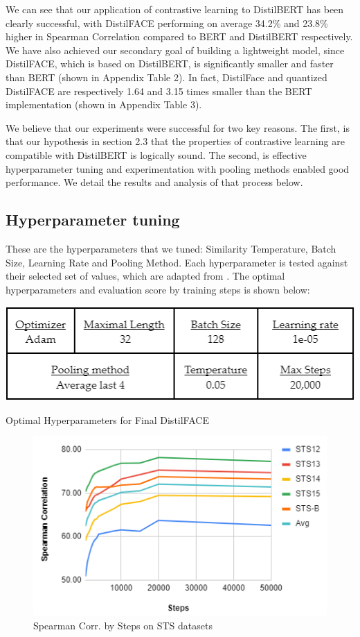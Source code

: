 \documentclass[10pt,twocolumn,letterpaper]{article}
\begin{document}
 We can see that our application of contrastive learning to DistilBERT has been clearly successful, with DistilFACE performing on average 34.2\% and 23.8\% higher in Spearman Correlation compared to BERT and DistilBERT respectively. We have also achieved our secondary goal of building a lightweight model, since DistilFACE, which is based on DistilBERT, is significantly smaller and faster than BERT \cite{1910.01108} (shown in Appendix Table 2).  In fact, DistilFace and quantized DistilFACE are respectively 1.64 and 3.15 times smaller than the BERT implementation (shown in Appendix Table 3). 


We believe that our experiments were successful for two key reasons. The first, is that our hypothesis in section 2.3 that the properties of contrastive learning are compatible with DistilBERT is logically sound. The second, is effective hyperparameter tuning and experimentation with pooling methods enabled good performance. We detail the results and analysis of that process below.

\subsection{Hyperparameter tuning}

These are the hyperparameters that we tuned: Similarity Temperature, Batch Size, Learning Rate and Pooling Method. Each hyperparameter is tested against their selected set of values, which are adapted from \cite{2104.08821}. The optimal hyperparameters and evaluation score by training steps is shown below:

\begin{table}[hbt!]
\centering
\includegraphics[scale=0.60]{images/Optimal-Hyperparameters.png}
\caption{Optimal Hyperparameters for Final DistilFACE}
\label{fig:short}
\end{table}

\begin{figure}[hbt!]
\centering
\includegraphics[scale=0.70]{images/Results-Evaluation-Score-by-Steps.png}
\caption{Spearman Corr. by Steps on STS datasets}
\label{fig:short}
\end{figure}
\end{document}

